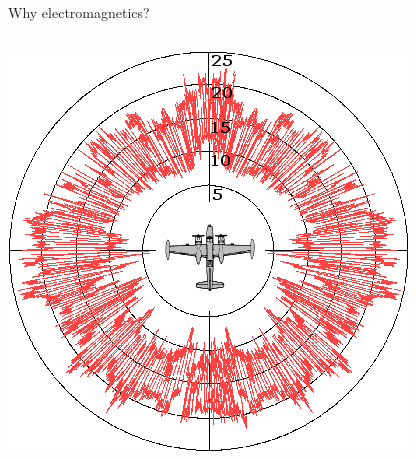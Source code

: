 \documentclass[aspectratio=169, usenames, dvipsnames]{beamer}
\begin{document}
\begin{frame}{Why electromagnetics?}
{\begin{columns}
        \centering
        \includegraphics[width=\textwidth]{figures/Sigma_invader_RCS}
    \end{columns}
  }
\end{frame}
\end{document}
